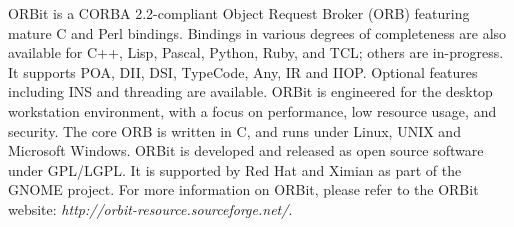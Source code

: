

ORBit is a CORBA 2.2-compliant Object Request Broker (ORB) featuring 
mature C and Perl bindings. Bindings in various degrees of completeness 
are also available for C++, Lisp, Pascal, Python, Ruby, and TCL; others 
are in-progress. It supports POA, DII, DSI, TypeCode, Any, IR and IIOP. 
Optional features including INS and threading are available. ORBit is 
engineered for the desktop workstation environment, with a focus on 
performance, low resource usage, and security.  The core ORB is 
written in C, and runs under Linux, UNIX and Microsoft Windows. ORBit is 
developed and released as open source software under GPL/LGPL.  
It is supported by Red Hat and Ximian as part of the 
GNOME project.\cite{orbit} For more information on ORBit, please refer to 
the ORBit website: {\em{http://orbit-resource.sourceforge.net/}}.


